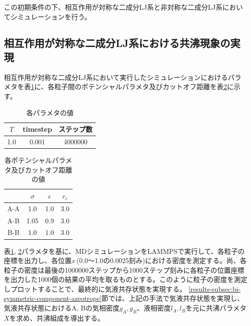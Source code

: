 \documentclass[titlepage]{jsreport}
\begin{document}
この初期条件の下、相互作用が対称な二成分LJ系と非対称な二成分LJ系においてシミュレーションを行う。

\subsection{相互作用が対称な二成分LJ系における共沸現象の実現} \label{method-subsec:bi-symmetric-component-azeotrope}
相互作用が対称な二成分LJ系において実行したシミュレーションにおけるパラメタを表\ref{table:symmetric-bi-component-azeotrope-parameter}に、各粒子間のポテンシャルパラメタ及びカットオフ距離を表\ref{table:symmetric-bi-component-azeotrope-potential-parameter}に示す。

\begin{table}[htbp]
    \begin{center}
        \caption{各パラメタの値}
        \label{table:symmetric-bi-component-azeotrope-parameter}
            \begin{tabular}{c c c}
                $T$ & timestep & ステップ数 \\
                \hline
                1.0 & 0.001 & 4000000 \\
            \end{tabular}
    \end{center}
\end{table}

\begin{table}[htbp]
    \begin{center}
        \caption{各ポテンシャルパラメタ及びカットオフ距離の値}
        \label{table:symmetric-bi-component-azeotrope-potential-parameter}
            \begin{tabular}{c c c c}
                & $\sigma$ & $\epsilon$ & $r_c$ \\
                \hline
                A-A & 1.0 & 1.0 & 3.0 \\
                A-B & 1.05 & 0.9 & 3.0 \\
                B-B & 1.0 & 1.0 & 3.0
            \end{tabular}
    \end{center}
\end{table}

表\ref{table:symmetric-bi-component-azeotrope-parameter}, \ref{table:symmetric-bi-component-azeotrope-potential-parameter}パラメタを基に、MDシミュレーションをLAMMPSで実行して、各粒子の座標を出力し、各位置$x$\,(0.0〜1.0の0.0025刻み)における密度を測定する。尚、各粒子の密度は最後の1000000ステップから1000ステップ刻みに各粒子の位置座標を出力した1000個の結果の平均を取るものとする。このように粒子の密度を測定しプロットすることで、最終的に気液共存状態を実現する。
\ref{results-subsec:bi-symmetric-component-azeotrope}節では、上記の手法で気液共存状態を実現し、気液共存状態におけるA, Bの気相密度$g_A, g_B$、液相密度$l_A, l_B$を元に共沸パラメタ$X$を求め、共沸組成を導出する。
\end{document}
